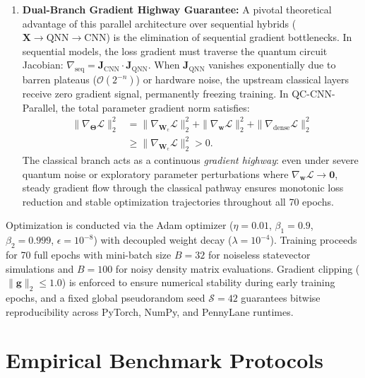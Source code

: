 \documentclass[journal]{IEEEtran}
\begin{document}
\begin{enumerate}
    \item \textbf{Dual-Branch Gradient Highway Guarantee:} A pivotal theoretical advantage of this parallel architecture over sequential hybrids ($\mathbf{X} \to \text{QNN} \to \text{CNN}$) is the elimination of sequential gradient bottlenecks. In sequential models, the loss gradient must traverse the quantum circuit Jacobian: $\nabla_{\mathrm{seq}} = \mathbf{J}_{\mathrm{CNN}} \cdot \mathbf{J}_{\mathrm{QNN}}$. When $\mathbf{J}_{\mathrm{QNN}}$ vanishes exponentially due to barren plateaus ($\mathcal{O}(2^{-n})$) or hardware noise, the upstream classical layers receive zero gradient signal, permanently freezing training. In QC-CNN-Parallel, the total parameter gradient norm satisfies:
    \begin{align}
    \|\nabla_{\boldsymbol{\Theta}} \mathcal{L}\|_2^2 &= \|\nabla_{\mathbf{W}_{\mathrm{c}}} \mathcal{L}\|_2^2 + \|\nabla_{\mathbf{w}} \mathcal{L}\|_2^2 + \|\nabla_{\mathrm{dense}} \mathcal{L}\|_2^2 \nonumber \\
    &\ge \|\nabla_{\mathbf{W}_{\mathrm{c}}} \mathcal{L}\|_2^2 > 0.
    \label{eq:gradient_highway_inequality}
    \end{align}
    The classical branch acts as a continuous \textit{gradient highway}: even under severe quantum noise or exploratory parameter perturbations where $\nabla_{\mathbf{w}} \mathcal{L} \to \mathbf{0}$, steady gradient flow through the classical pathway ensures monotonic loss reduction and stable optimization trajectories throughout all 70 epochs.
\end{enumerate}
Optimization is conducted via the Adam optimizer ($\eta = 0.01$, $\beta_1 = 0.9$, $\beta_2 = 0.999$, $\epsilon = 10^{-8}$) with decoupled weight decay ($\lambda = 10^{-4}$). Training proceeds for 70 full epochs with mini-batch size $B = 32$ for noiseless statevector simulations and $B = 100$ for noisy density matrix evaluations. Gradient clipping ($\|\mathbf{g}\|_2 \le 1.0$) is enforced to ensure numerical stability during early training epochs, and a fixed global pseudorandom seed $\mathcal{S}=42$ guarantees bitwise reproducibility across PyTorch, NumPy, and PennyLane runtimes.

\section{Empirical Benchmark Protocols}
\label{sec:protocols}
\end{document}
